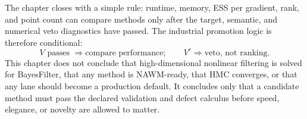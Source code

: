 The chapter closes with a simple rule: runtime, memory, ESS per gradient, rank,
and point count can compare methods only after the target, semantic, and
numerical veto diagnostics have passed.  The industrial promotion logic is
therefore conditional:
\begin{equation}
  V \text{ passes } \Longrightarrow \text{compare performance};
  \qquad
  V^c \Longrightarrow \text{veto, not ranking.}
  \label{eq:bf-hd-validation-veto-logic}
\end{equation}
This chapter does not conclude that high-dimensional nonlinear filtering is
solved for BayesFilter, that any method is NAWM-ready, that HMC converges, or
that any lane should become a production default.  It concludes only that a
candidate method must pass the declared validation and defect calculus before
speed, elegance, or novelty are allowed to matter.
